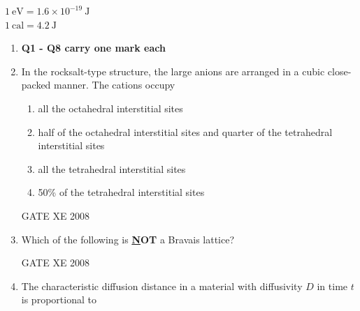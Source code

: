 \documentclass[12pt]{article}
\begin{document}
$1 \ \text{eV} = 1.6 \times 10^{-19} \ \text{J}$ \\
$1 \ \text{cal} = 4.2 \ \text{J}$

\begin{enumerate}[label=Q\arabic*.]
\item[] \textbf{Q1 - Q8 carry one mark each}

\item In the rocksalt-type structure, the large anions are arranged in a cubic close-packed manner. The cations occupy

\begin{enumerate}[label=(\Alph*)]

\item  all the octahedral interstitial sites
\item  half of the octahedral interstitial sites and quarter of the tetrahedral interstitial sites
\item  all the tetrahedral interstitial sites
\item  50\% of the tetrahedral interstitial sites
\end{enumerate}

GATE XE 2008
\item  Which of the following is \textbf{\underline NOT} a Bravais lattice?

\begin{enumerate}[label=(\Alph*)]
\end{enumerate}

GATE XE 2008
\item The characteristic diffusion distance in a material with diffusivity $D$ in time $t$ is proportional to  

\begin{enumerate}[label=(\Alph*)]
\end{enumerate}


\end{enumerate}
\end{document}
